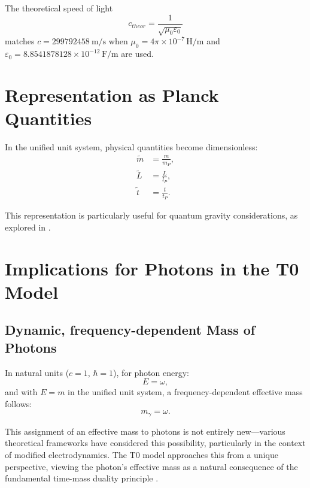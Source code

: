 \documentclass[12pt,a4paper]{article}
\begin{document}
	The theoretical speed of light
	\begin{equation}
		c_{theor} = \frac{1}{\sqrt{\mu_0 \varepsilon_0}}
	\end{equation}
	matches \(c = \SI{299792458}{\meter\per\second}\) when \(\mu_0 = 4\pi \times 10^{-7} \, \si{\henry\per\meter}\) and \(\varepsilon_0 = 8.8541878128 \times 10^{-12} \, \si{\farad\per\meter}\) are used.
	
	\section{Representation as Planck Quantities}
	\label{sec:planck_quantities}
	
	In the unified unit system, physical quantities become dimensionless:
	\begin{align}
		\tilde{m} &= \frac{m}{m_P}, \\
		\tilde{L} &= \frac{L}{l_P}, \\
		\tilde{t} &= \frac{t}{t_P}.
	\end{align}
	
	This representation is particularly useful for quantum gravity considerations, as explored in \cite{pascher_planck_2025}.
	
	\section{Implications for Photons in the T0 Model}
	\label{sec:photons}
	
	\subsection{Dynamic, frequency-dependent Mass of Photons}
	\label{subsec:photon_dynamic_mass}
	
	In natural units (\(c = 1\), \(\hbar = 1\)), for photon energy:
	\begin{equation}
		E = \omega,
	\end{equation}
	and with \(E = m\) in the unified unit system, a frequency-dependent effective mass follows:
	\begin{equation}
		m_{\gamma} = \omega.
	\end{equation}
	
	This assignment of an effective mass to photons is not entirely new—various theoretical frameworks have considered this possibility, particularly in the context of modified electrodynamics. The T0 model approaches this from a unique perspective, viewing the photon's effective mass as a natural consequence of the fundamental time-mass duality principle \cite{pascher_photons_2025}.
	
\end{document}
